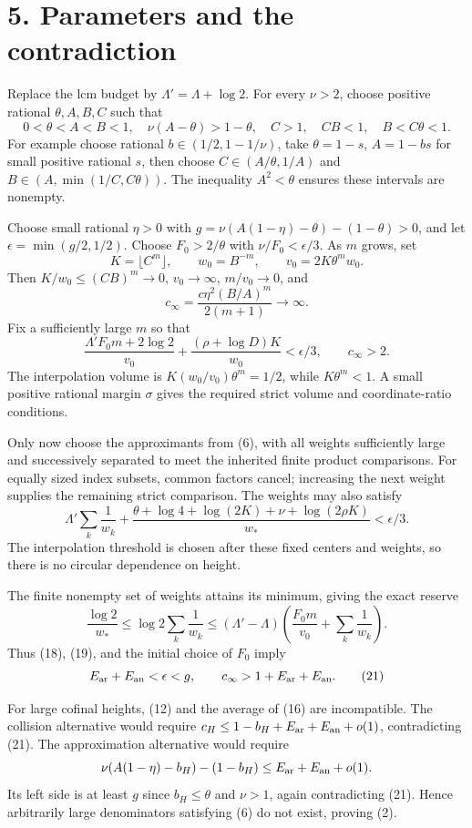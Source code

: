 \documentclass[11pt]{article}
\begin{document}
\section{5. Parameters and the
contradiction}\label{parameters-and-the-contradiction}

Replace the lcm budget by \(\Lambda'=\Lambda+\log2\). For every
\(\nu>2\), choose positive rational \(\theta,A,B,C\) such that \[
0<\theta<A<B<1,\quad \nu(A-\theta)>1-\theta,
\quad C>1,\quad CB<1,\quad B<C\theta<1.
\tag{17}
\] For example choose rational \(b\in(1/2,1-1/\nu)\), take
\(\theta=1-s\), \(A=1-bs\) for small positive rational \(s\), then
choose \(C\in(A/\theta,1/A)\) and \(B\in(A,\min(1/C,C\theta))\). The
inequality \(A^2<\theta\) ensures these intervals are nonempty.

Choose small rational \(\eta>0\) with
\(g=\nu(A(1-\eta)-\theta)-(1-\theta)>0\), and let
\(\epsilon=\min(g/2,1/2)\). Choose \(F_0>2/\theta\) with
\(\nu/F_0<\epsilon/3\). As \(m\) grows, set \[
K=\lfloor C^m\rfloor,\qquad w_0=B^{-m},\qquad
v_0=2K\theta^mw_0.
\] Then \(K/w_0\le(CB)^m\to0\), \(v_0\to\infty\), \(m/v_0\to0\), and \[
c_\infty=\frac{c\eta^2(B/A)^m}{2(m+1)}\longrightarrow\infty.
\] Fix a sufficiently large \(m\) so that \[
\frac{\Lambda'F_0m+2\log2}{v_0}
+\frac{(\rho+\log D)K}{w_0}<\epsilon/3,\qquad c_\infty>2.
\tag{18}
\] The interpolation volume is \(K(w_0/v_0)\theta^m=1/2\), while
\(K\theta^m<1\). A small positive rational margin \(\sigma\) gives the
required strict volume and coordinate-ratio conditions.

Only now choose the approximants from (6), with all weights sufficiently
large and successively separated to meet the inherited finite product
comparisons. For equally sized index subsets, common factors cancel;
increasing the next weight supplies the remaining strict comparison. The
weights may also satisfy \[
\Lambda'\sum_k\frac1{w_k}
+\frac{\theta+\log4+\log(2K)+\nu+\log(2\rho K)}{w_*}<\epsilon/3.
\tag{19}
\] The interpolation threshold is chosen after these fixed centers and
weights, so there is no circular dependence on height.

The finite nonempty set of weights attains its minimum, giving the exact
reserve \[
\frac{\log2}{w_*}\le\log2\sum_k\frac1{w_k}
\le(\Lambda'-\Lambda)
\left(\frac{F_0m}{v_0}+\sum_k\frac1{w_k}\right).
\tag{20}
\] Thus (18), (19), and the initial choice of \(F_0\) imply \[
E_{\rm ar}+E_{\rm an}<\epsilon<g,
\qquad c_\infty>1+E_{\rm ar}+E_{\rm an}.
\tag{21}
\]

For large cofinal heights, (12) and the average of (16) are
incompatible. The collision alternative would require
\(c_H\le1-b_H+E_{\rm ar}+E_{\rm an}+o(1)\), contradicting (21). The
approximation alternative would require \[
\nu(A(1-\eta)-b_H)-(1-b_H)
\le E_{\rm ar}+E_{\rm an}+o(1).
\] Its left side is at least \(g\) since \(b_H\le\theta\) and \(\nu>1\),
again contradicting (21). Hence arbitrarily large denominators
satisfying (6) do not exist, proving (2).
\end{document}
